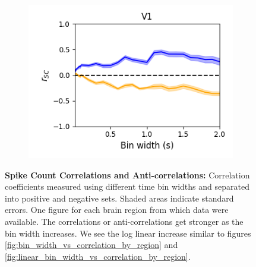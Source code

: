\documentclass[a4paper,12pt]{article}
\theoremstyle{definition}
\begin{document}
\begin{figure}[p]
\begin{subfigure}{0.5\textwidth}
    \includegraphics[width=\textwidth]{figures/linear_bin_width_relative_correlations_v1_6.png}
  \end{subfigure}
  \caption{\textbf{Spike Count Correlations and Anti-correlations:} Correlation coefficients measured using different time bin widths and separated into positive and negative sets. Shaded areas indicate standard errors. One figure for each brain region from which data were available. The correlations or anti-correlations get stronger as the bin width increases. We see the log linear increase similar to figures \ref{fig:bin_width_vs_correlation_by_region} and \ref{fig:linear_bin_width_vs_correlation_by_region}.}
  \label{fig:corr_anti_corr_by_region}
\end{figure}
\end{document}
